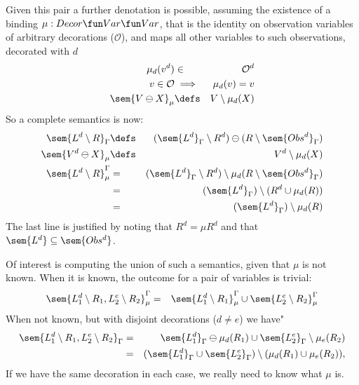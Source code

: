 Given this pair a further denotation is possible,
assuming the existence of a binding $\mu : Decor \fun Var \fun Var$,
that is the identity on observation variables of arbitrary decorations
($\mathcal O$),
and maps all other variables to such observations, decorated with $d$
\begin{eqnarray*}
   \mu_d(v^d) &\in& \mathcal O^d
\\ v \in \mathcal O &\implies& \mu_d(v)=v
\\ \sem{V \ominus X}_{\mu} &\defs& V \setminus \mu_d(X)
\end{eqnarray*}
So a complete semantics is now:
\begin{eqnarray*}
   \sem{L^d\setminus R}_{\Gamma}
   &\defs &
   (\sem{L^d}_\Gamma \setminus R^d) \ominus  (R \setminus\sem{Obs^d}_\Gamma)
\\ \sem{V^d \ominus X}_{\mu}
   &\defs& V^d \setminus \mu_d(X)
\\ \sem{L^d\setminus R}^{\Gamma}_{\mu}
   &= &
   (\sem{L^d}_\Gamma \setminus R^d) \setminus  \mu_d(R \setminus\sem{Obs^d}_\Gamma)
\\ &=&
   (\sem{L^d}_\Gamma) \setminus (R^d \cup \mu_d(R))
\\ &=&
   (\sem{L^d}_\Gamma) \setminus \mu_d(R)
\end{eqnarray*}
The last line is justified by noting that $R^d = \mu R^d$
and that $\sem{L^d} \subseteq \sem{Obs^d}$.


Of interest is computing the union of such a semantics,
given that $\mu$ is not known.
When it is known, the outcome for a pair of variables is trivial:
\begin{eqnarray*}
  \sem{L_1^d\setminus R_1, L_2^e\setminus R_2}_{\mu}^{\Gamma}
  &=& \sem{L_1^d\setminus R_1}_{\mu}^{\Gamma}
      \cup
      \sem{L_2^e\setminus R_2}_{\mu}^{\Gamma}
\end{eqnarray*}
When not known, but with disjoint decorations ($d\neq e$) we have"
\begin{eqnarray*}
  \sem{L_1^d\setminus R_1, L_2^e\setminus R_2}_{\Gamma}
  &=& \sem{L_1^d}_{\Gamma} \ominus \mu_d(R_1)
      \cup
      \sem{L_2^e}_{\Gamma} \setminus \mu_e(R_2)
\\ &=& (\sem{L_1^d}_{\Gamma}\cup\sem{L_2^e}_{\Gamma})
       \setminus
       (\mu_d(R_1)\cup \mu_e(R_2)),
\end{eqnarray*}
If we have the same decoration in each case,
we really need to know what $\mu$ is.
